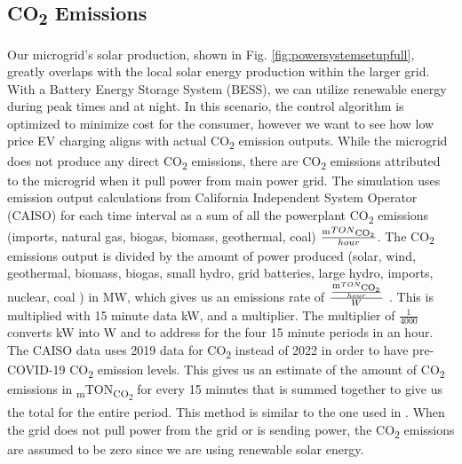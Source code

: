 \documentclass[conference]{IEEEtran}
\begin{document}
    \subsection{CO\textsubscript{2} Emissions}
        	Our microgrid's solar production, shown in Fig. \ref{fig:powersystemsetupfull}, greatly overlaps with the local solar energy production within the larger grid.  With a Battery Energy Storage System (BESS), we can utilize renewable energy during peak times and at night. In this scenario, the control algorithm is optimized to minimize cost for the consumer, however we want to see how low price EV charging aligns with actual CO\textsubscript{2} emission outputs.  While the microgrid does not produce any direct CO\textsubscript{2} emissions, there are CO\textsubscript{2} emissions attributed to the microgrid when it pull power from main power grid.  The simulation uses emission output calculations from California Independent System Operator (CAISO) for each time interval as a sum of all the powerplant CO\textsubscript{2} emissions (imports, natural gas, biogas, biomass, geothermal, coal) $\frac{\textsubscript{m}TON\textsubscript{CO\textsubscript{2}}}{hour}$. The CO\textsubscript{2} emissions output is divided by the amount of power produced (solar, wind, geothermal, biomass, biogas, small hydro, grid batteries, large hydro, imports, nuclear, coal ) in MW, which gives us an emissions rate of $\frac{\frac{\textsubscript{m}TON\textsubscript{CO\textsubscript{2}}}{hour}}{W}$ . This is multiplied with 15 minute data kW, and a multiplier. The multiplier of  $\frac{1}{4000}$ converts kW into W and to address for the four 15 minute periods in an hour.  The CAISO data uses 2019 data for CO\textsubscript{2} instead of 2022 in order to have pre-COVID-19 CO\textsubscript{2} emission levels. This gives us an estimate of the amount of CO\textsubscript{2} emissions in \textsubscript{m}TON\textsubscript{CO\textsubscript{2}} for every 15 minutes that is summed together to give us the total for the entire period.  This method is similar to the one used in \cite{garrido2021dynamic}.  When the grid does not pull power from the grid or is sending power, the CO\textsubscript{2} emissions are assumed to be zero since we are using renewable solar energy.
\end{document}
